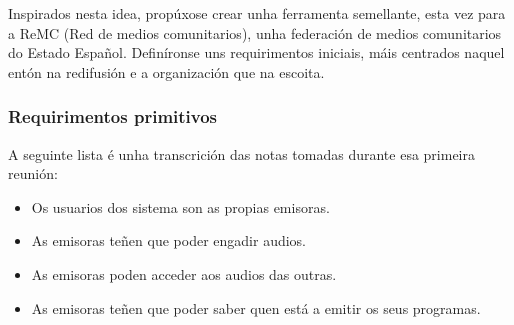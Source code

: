 Inspirados nesta idea, propúxose crear unha ferramenta semellante, esta vez para a ReMC (Red de medios comunitarios), unha federación de medios comunitarios do Estado Español. Definíronse uns requirimentos iniciais, máis centrados naquel entón na
redifusión e a organización que na escoita.

\subsubsection{Requirimentos primitivos}

A seguinte lista é unha transcrición das notas tomadas durante esa primeira reunión:

\begin{itemize}
	\item Os usuarios dos sistema son as propias emisoras.
	\item As emisoras teñen que poder engadir audios.
	\item As emisoras poden acceder aos audios das outras.
	\item As emisoras teñen que poder saber quen está a emitir os seus programas.
\end{itemize}


